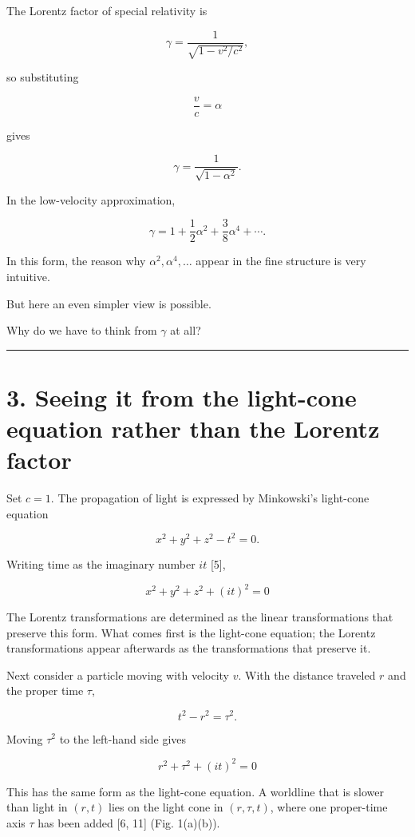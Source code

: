 \documentclass[
  a4paper,
]{article}
\begin{document}
The Lorentz factor of special relativity is

\[
\gamma=
\frac1{\sqrt{1-v^2/c^2}},
\]

so substituting

\[
\frac vc=\alpha
\]

gives

\[
\gamma=
\frac1{\sqrt{1-\alpha^2}}.
\]

In the low-velocity approximation,

\[
\gamma
=
1+\frac12\alpha^2
+\frac38\alpha^4+\cdots .
\]

In this form, the reason why \(\alpha^2,\alpha^4,\ldots\) appear in the
fine structure is very intuitive.

But here an even simpler view is possible.

Why do we have to think from \(\gamma\) at all?

\begin{center}\rule{0.5\linewidth}{0.5pt}\end{center}

\section{3. Seeing it from the light-cone equation rather than the
Lorentz
factor}\label{seeing-it-from-the-light-cone-equation-rather-than-the-lorentz-factor}

Set \(c=1\). The propagation of light is expressed by Minkowski's
light-cone equation

\[
x^2+y^2+z^2-t^2=0 .
\]

Writing time as the imaginary number \(it\) {[}5{]},

\[
\boxed{x^2+y^2+z^2+(it)^2=0}
\]

The Lorentz transformations are determined as the linear transformations
that preserve this form. What comes first is the light-cone equation;
the Lorentz transformations appear afterwards as the transformations
that preserve it.

Next consider a particle moving with velocity \(v\). With the distance
traveled \(r\) and the proper time \(\tau\),

\[
t^2-r^2=\tau^2 .
\]

Moving \(\tau^2\) to the left-hand side gives

\[
\boxed{r^2+\tau^2+(it)^2=0}
\]

This has the same form as the light-cone equation. A worldline that is
slower than light in \((r,t)\) lies on the light cone in \((r,\tau,t)\),
where one proper-time axis \(\tau\) has been added {[}6, 11{]} (Fig.
1(a)(b)).
\end{document}
